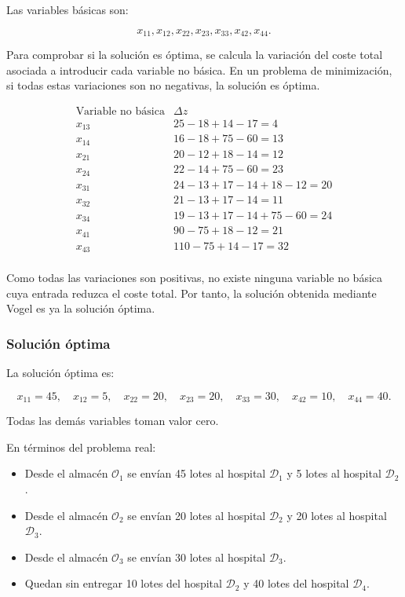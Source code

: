 Las variables básicas son:

\[
x_{11}, x_{12}, x_{22}, x_{23}, x_{33}, x_{42}, x_{44}.
\]

Para comprobar si la solución es óptima, se calcula la variación del coste total asociada a introducir cada variable no básica. En un problema de minimización, si todas estas variaciones son no negativas, la solución es óptima.

\[
\begin{array}{c|c}
\text{Variable no básica} & \Delta z \\
\hline
x_{13} & 25-18+14-17 = 4 \\
x_{14} & 16-18+75-60 = 13 \\
x_{21} & 20-12+18-14 = 12 \\
x_{24} & 22-14+75-60 = 23 \\
x_{31} & 24-13+17-14+18-12 = 20 \\
x_{32} & 21-13+17-14 = 11 \\
x_{34} & 19-13+17-14+75-60 = 24 \\
x_{41} & 90-75+18-12 = 21 \\
x_{43} & 110-75+14-17 = 32 \\
\end{array}
\]

Como todas las variaciones son positivas, no existe ninguna variable no básica cuya entrada reduzca el coste total. Por tanto, la solución obtenida mediante Vogel es ya la solución óptima.

\subsubsection*{Solución óptima}

La solución óptima es:

\[
x_{11}=45, \quad x_{12}=5, \quad x_{22}=20, \quad x_{23}=20, \quad x_{33}=30,
\quad x_{42}=10, \quad x_{44}=40.
\]

Todas las demás variables toman valor cero.

En términos del problema real:

\begin{itemize}
    \item Desde el almacén $\mathcal{O}_1$ se envían 45 lotes al hospital $\mathcal{D}_1$ y 5 lotes al hospital $\mathcal{D}_2$.
    \item Desde el almacén $\mathcal{O}_2$ se envían 20 lotes al hospital $\mathcal{D}_2$ y 20 lotes al hospital $\mathcal{D}_3$.
    \item Desde el almacén $\mathcal{O}_3$ se envían 30 lotes al hospital $\mathcal{D}_3$.
    \item Quedan sin entregar 10 lotes del hospital $\mathcal{D}_2$ y 40 lotes del hospital $\mathcal{D}_4$.
\end{itemize}

